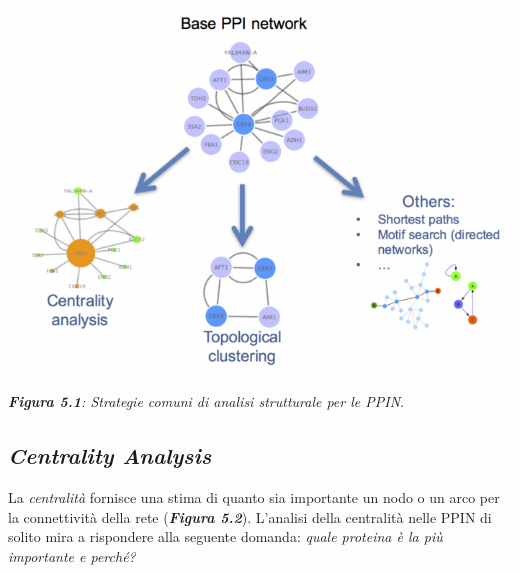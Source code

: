 \documentclass[11pt]{article}
\begin{document}
\begin{center}
\includegraphics[scale=0.35]{ppin}

\begin{small}\textit{\textbf{Figura 5.1}: Strategie comuni di analisi strutturale per le PPIN}.\end{small}
\end{center}

\subsection{\textit{Centrality Analysis}}
La \textit{centralità} fornisce una stima di quanto sia importante un nodo o un arco per la connettività della rete (\textit{\textbf{Figura 5.2}}).
L'analisi della centralità nelle PPIN di solito mira a rispondere alla seguente domanda: \textit{quale proteina è la più importante e perché?}
\end{document}
